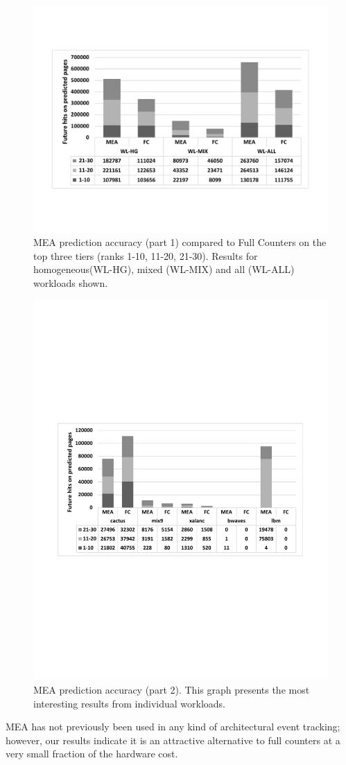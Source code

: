 \begin{figure}[t]
\centering
  \includegraphics[scale=.3]{figures/mea_2_v2.pdf}
  \caption{MEA prediction accuracy (part 1) compared to Full Counters on the top three tiers (ranks 1-10, 11-20, 21-30). Results for homogeneous(WL-HG), mixed (WL-MIX) and all (WL-ALL) workloads shown.}
  \label{fig:mea_2}
\end{figure}

\begin{figure}[t]
\centering
  \includegraphics[scale=.45]{figures/mea_3_v2.pdf}
  \caption{MEA prediction accuracy (part 2). This graph presents the most interesting results from individual workloads.}
  \label{fig:mea_3}
\end{figure}

MEA has not previously been used in any kind of architectural event
tracking; however, our results indicate it is an attractive
alternative to full counters at a very small fraction of the hardware cost.
